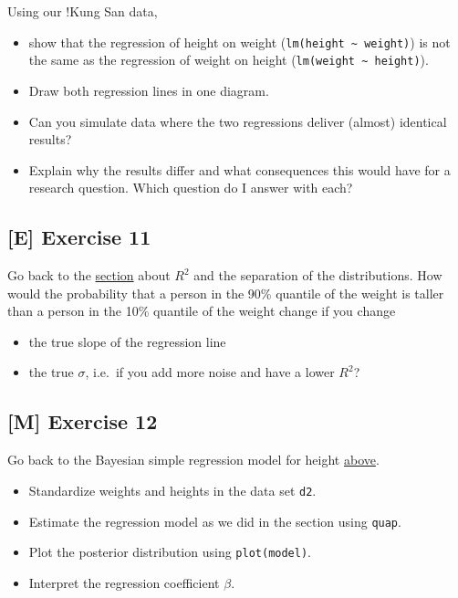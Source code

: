 \documentclass[
]{book}
\providecommand{\tightlist}{%
  \setlength{\itemsep}{0pt}\setlength{\parskip}{0pt}}
\begin{document}
Using our !Kung San data,

\begin{itemize}
\tightlist
\item
  show that the regression of height on weight (\texttt{lm(height\ \textasciitilde{}\ weight)})
  is not the same as the regression of weight on height (\texttt{lm(weight\ \textasciitilde{}\ height)}).
\item
  Draw both regression lines in one diagram.
\item
  Can you simulate data where the two regressions deliver (almost) identical results?
\item
  Explain why the results differ and what consequences this would have for a research question.
  Which question do I answer with each?
\end{itemize}

\subsection{{[}E{]} Exercise 11}\label{exercise11_simpl_lin_reg}

Go back to the \hyperref[seperating_property]{section} about \(R^2\) and the separation of the distributions.
How would the probability that a person in the 90\% quantile of the weight
is taller than a person in the 10\% quantile of the weight change if you change

\begin{itemize}
\tightlist
\item
  the true slope of the regression line
\item
  the true \(\sigma\), i.e.~if you add more noise and have a lower \(R^2\)?
\end{itemize}

\subsection{{[}M{]} Exercise 12}\label{exercise12_simpl_lin_reg}

Go back to the Bayesian simple regression model for height \hyperref[simple_lin_reg_bayes]{above}.

\begin{itemize}
\tightlist
\item
  Standardize weights and heights in the data set \texttt{d2}.
\item
  Estimate the regression model as we did in the section using \texttt{quap}.
\item
  Plot the posterior distribution using \texttt{plot(model)}.
\item
  Interpret the regression coefficient \(\beta\).
\end{itemize}
\end{document}
